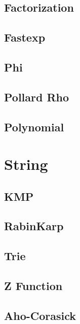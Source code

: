 \subsection{Factorization}
\raggedbottom
\hrulefill
\subsection{Fastexp}
\raggedbottom
\hrulefill
\subsection{Phi}
\raggedbottom
\hrulefill
\subsection{Pollard Rho}
\raggedbottom
\hrulefill
\subsection{Polynomial}
\raggedbottom
\hrulefill

\section{String}
\subsection{KMP}
\raggedbottom
\hrulefill
\subsection{RabinKarp}
\raggedbottom
\hrulefill
\subsection{Trie}
\raggedbottom
\hrulefill
\subsection{Z Function}
\raggedbottom
\hrulefill
\subsection{Aho-Corasick}
\raggedbottom
\hrulefill

